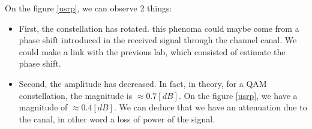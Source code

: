 \documentclass[frenchb, oneside, headings=normal]{scrartcl}
\begin{document}
On the figure \ref{usrp}, we can observe 2 things:

\begin{itemize}

\item First, the constellation has rotated. this phenoma could maybe come from a phase shift introduced in the received signal through the channel canal. We could make a link with the previous lab, which consisted of estimate the phase shift.

\item Second, the amplitude has decreased. In fact, in theory, for a QAM constellation, the magnitude is $\approx 0.7 [dB]$. On the figure \ref{usrp}, we have a magnitude of $\approx 0.4 [dB]$. We can deduce that we have an attenuation due to the canal, in other word a loss of power of the signal.



\end{itemize}


   
\end{document}
